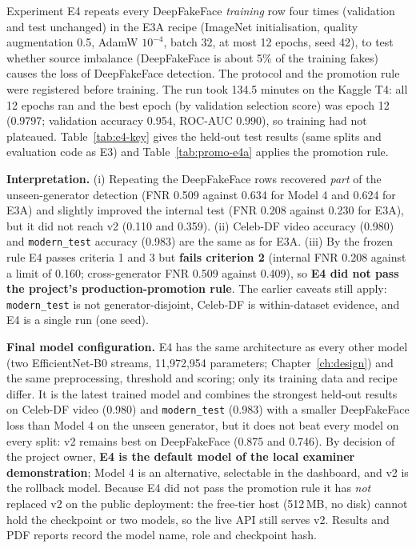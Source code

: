 Experiment E4 repeats every DeepFakeFace \emph{training} row four times (validation and test unchanged) in the E3A recipe (ImageNet initialisation, quality augmentation 0.5, AdamW $10^{-4}$, batch 32, at most 12 epochs, seed 42),
to test whether source imbalance (DeepFakeFace is about 5\% of the training fakes) causes the loss of DeepFakeFace detection. The protocol and the promotion rule were registered before training. The run took 134.5 minutes on the Kaggle T4: all 12 epochs ran and the best epoch (by validation selection score) was epoch 12 (0.9797; validation accuracy 0.954, ROC-AUC 0.990), so training had not plateaued. Table~\ref{tab:e4-key} gives the held-out test results
(same splits and evaluation code as E3) and Table~\ref{tab:promo-e4a} applies the promotion rule.



\textbf{Interpretation.} (i) Repeating the DeepFakeFace rows recovered \emph{part} of the unseen-generator detection (FNR 0.509 against 0.634 for Model 4 and 0.624 for E3A) and slightly improved the internal test (FNR 0.208 against 0.230 for E3A), but it did not reach v2
(0.110 and 0.359). (ii) Celeb-DF video accuracy (0.980) and \texttt{modern\_test} accuracy (0.983) are the same as for E3A. (iii) By the frozen rule E4 passes criteria 1 and 3 but \textbf{fails criterion 2} (internal FNR 0.208 against a limit of 0.160;
cross-generator FNR 0.509 against 0.409), so \textbf{E4 did not pass the project's production-promotion rule}. The earlier caveats still apply: \texttt{modern\_test} is not generator-disjoint, Celeb-DF is within-dataset evidence, and E4 is a single run (one seed).

\textbf{Final model configuration.} E4 has the same architecture as every other model (two EfficientNet-B0 streams, 11{,}972{,}954 parameters; Chapter~\ref{ch:design}) and the same preprocessing, threshold and scoring; only its training data and recipe differ. It is the latest trained model and combines the strongest held-out results on Celeb-DF video (0.980) and \texttt{modern\_test} (0.983) with a smaller DeepFakeFace loss than Model 4 on the unseen generator, but it does not beat every model on every split: v2 remains best on DeepFakeFace (0.875 and 0.746). By decision of the project owner, \textbf{E4 is the default model of the local examiner demonstration}; Model 4 is an alternative, selectable in the dashboard, and v2 is the rollback model. Because E4 did not pass the promotion rule it has \emph{not} replaced v2 on the public deployment: the free-tier host (512\,MB, no disk) cannot hold the checkpoint or two models, so the live API still serves v2. Results and PDF reports record the model name, role and checkpoint hash.
